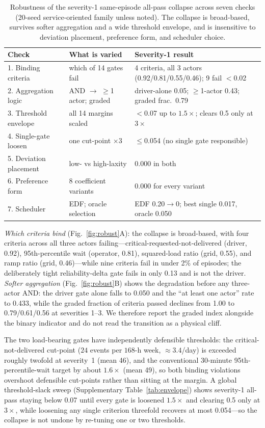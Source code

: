 \documentclass[12pt]{article}
\newcommand{\figref}[1]{Fig.~\ref{#1}}
\begin{document}
\begin{table}[t]
\centering
\caption{Robustness of the severity-1 same-episode all-pass collapse across seven checks (20-seed service-oriented family unless noted). The collapse is broad-based, survives softer aggregation and a wide threshold envelope, and is insensitive to deviation placement, preference form, and scheduler choice.}
\label{tab:robustsummary}
\begin{tabular}{lll}
\hline
Check & What is varied & Severity-1 result \\
\hline
1. Binding criteria & which of 14 gates fail & 4 criteria, all 3 actors (0.92/0.81/0.55/0.46); 9 fail $<$0.02 \\
2. Aggregation logic & AND $\to$ $\geq$1 actor; graded & driver-alone 0.05; $\geq$1-actor 0.43; graded frac.\ 0.79 \\
3. Threshold envelope & all 14 margins scaled & $<$0.07 up to $1.5\times$; clears 0.5 only at $3\times$ \\
4. Single-gate loosen & one cut-point $\times3$ & $\leq$0.054 (no single gate responsible) \\
5. Deviation placement & low- vs high-laxity & 0.000 in both \\
6. Preference form & 8 coefficient variants & 0.000 for every variant \\
7. Scheduler & EDF; oracle selection & EDF 0.20$\to$0; best single 0.017, oracle 0.050 \\
\hline
\end{tabular}
\end{table}

\emph{Which criteria bind} (\figref{fig:robust}A): the collapse is broad-based, with four criteria across all three actors failing---critical-requested-not-delivered (driver, 0.92), 95th-percentile wait (operator, 0.81), squared-load ratio (grid, 0.55), and ramp ratio (grid, 0.46)---while nine criteria fail in under 2\% of episodes; the deliberately tight reliability-delta gate fails in only 0.13 and is not the driver. \emph{Softer aggregation} (\figref{fig:robust}B) shows the degradation before any three-actor AND: the driver gate alone falls to 0.050 and the ``at least one actor'' rate to 0.433, while the graded fraction of criteria passed declines from 1.00 to 0.79/0.61/0.56 at severities 1--3. We therefore report the graded index alongside the binary indicator and do not read the transition as a physical cliff.

The two load-bearing gates have independently defensible thresholds: the critical-not-delivered cut-point ($24$ events per $168$-h week, $\approx3.4$/day) is exceeded roughly twofold at severity~1 (mean 46), and the conventional 30-minute 95th-percentile-wait target by about $1.6\times$ (mean 49), so both binding violations overshoot defensible cut-points rather than sitting at the margin. A global threshold-slack sweep (Supplementary Table~\ref{tab:envelope}) shows severity-1 all-pass staying below 0.07 until every gate is loosened $1.5\times$ and clearing 0.5 only at $3\times$, while loosening any single criterion threefold recovers at most 0.054---so the collapse is not undone by re-tuning one or two thresholds.
\end{document}
